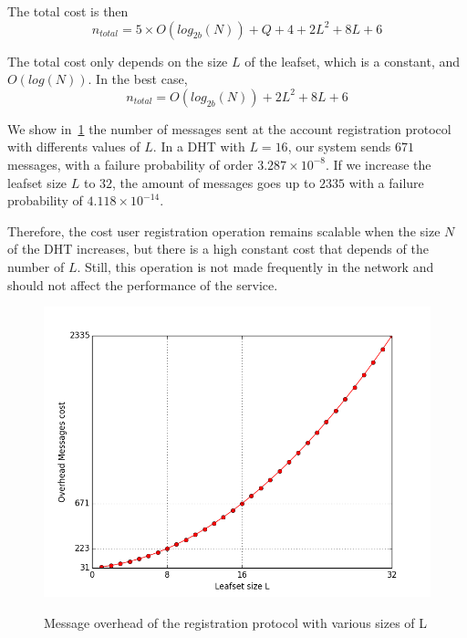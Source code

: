      The total cost is then
    $$
      n_{total} = 5 \times O(log_{2b}(N)) + Q + 4 + 2L^2 + 8L + 6
    $$    

    The total cost only depends on the size $L$ of the leafset, which is a
constant, and $O(log(N))$. In the best case, 
    $$
      n_{total} = O(log_{2b}(N)) + 2L^2 + 8L + 6
    $$

    We show in~\ref{fig:registration_messages} the number of messages sent at
    the account registration protocol with differents values of $L$. In a DHT with
    $L = 16$, our system sends $671$ messages, with a failure probability of
    order $3.287 \times 10^{-8}$. If we increase the leafset size $L$ to $32$, the amount of
    messages goes up to $2335$ with a failure probability of $4.118 \times 10^{-14}$.
  
    Therefore, the cost user registration operation remains scalable when the
    size $N$ of the DHT increases, but there is a high constant cost that
    depends of the number of $L$. Still, this operation is not made frequently
    in the network and should not affect the performance of the
    service.

\begin{figure}[!htb]
\centering
\includegraphics[width=14cm]{../plots/account_registration_messages}\\
\caption{Message overhead of the registration protocol with various sizes of L}
\label{fig:registration_messages}
\end{figure}


